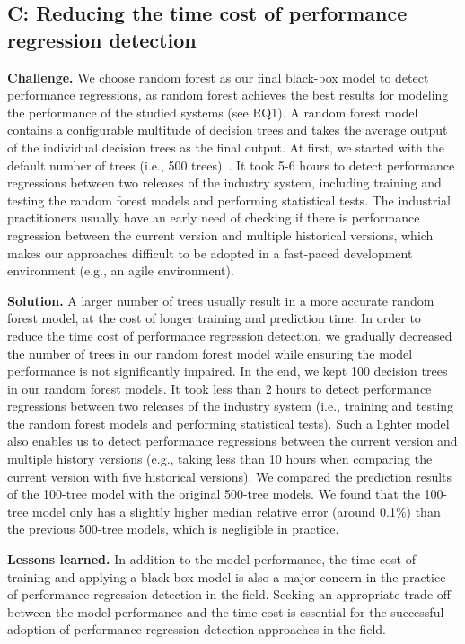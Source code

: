 \subsection*{C: Reducing the time cost of performance regression detection}
\noindent\textbf{Challenge.}
We choose random forest as our final black-box model to detect performance regressions, as random forest achieves the best results for modeling the performance of the studied systems (see RQ1).
A random forest model contains a configurable multitude of decision trees and takes the average output of the individual decision trees as the final output.
At first, we started with the default number of trees (i.e., 500 trees)~\citep{R-RandomForest}.
It took 5-6 hours to detect performance regressions between two releases of the industry system, including training and testing the random forest models and performing statistical tests. 
The industrial practitioners usually have an early need of checking if there is performance regression between the current version and multiple historical versions, which makes our approaches difficult to be adopted in a fast-paced development environment (e.g., an agile environment).

\noindent\textbf{Solution.}
A larger number of trees usually result in a more accurate random forest model, at the cost of longer training and prediction time.
In order to reduce the time cost of performance regression detection, we gradually decreased the number of trees in our random forest model while ensuring the model performance is not significantly impaired.
In the end, we kept 100 decision trees in our random forest models.
It took less than 2 hours to detect performance regressions between two releases of the industry system (i.e., training and testing the random forest models and performing statistical tests). 
Such a lighter model also enables us to detect performance regressions between the current version and multiple history versions (e.g., taking less than 10 hours when comparing the current version with five historical versions). 
We compared the prediction results of the 100-tree model with the original 500-tree models. We found that the 100-tree model only has a slightly higher median relative error (around 0.1\%) than the previous 500-tree models, which is negligible in practice.

\noindent\textbf{Lessons learned.}
In addition to the model performance, the time cost of training and applying a black-box model is also a major concern in the practice of performance regression detection in the field.
Seeking an appropriate trade-off between the model performance and the time cost is essential for the successful adoption of performance regression detection approaches in the field.


